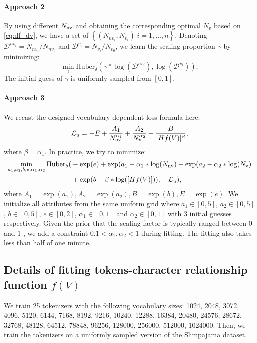 \paragraph{Approach 2}  By using different $N_{\rm nv}$ and obtaining the corresponding optimal $N_v$ based on \autoref{eq:df_dv}, we have a set of  $\left\{  (N_{{nv}_i}, N_{{v}_i})| i=1,...,n \right\}$. Denoting $\mathcal{D}^{{nv}_i} = N_{{nv}_i} / N_{{nv}_0}$ and $\mathcal{D}^{{v}_i} = N_{{v}_i} / N_{{v}_0}$, we learn the scaling proportion $\gamma$ by minimizing:
\begin{equation}
    \min_{\gamma} \text{Huber}_\delta (\gamma*\log(\mathcal{D}^{{nv}_i}), \log(\mathcal{D}^{{v}_i})),
\end{equation}
The initial guess of $\gamma$ is uniformly sampled from $[0,1]$.

\paragraph{Approach 3} We recast the designed  vocabulary-dependent loss formula here:
\begin{equation}
    \mathcal{L}_u = -E + \frac{A_1}{N_{\rm nv}^{\alpha_1}} +\frac{A_2}{N_v^{\alpha_2}}+ \frac{B}{[Hf(V)]^{\beta}},
\end{equation}
where $\beta=\alpha_1$.  In practice, we try to minimize:
\begin{align*}
    \min_{a_1,a_2,b,e,\alpha_1, \alpha_2} \text{Huber}_\delta (&-\exp(e) + \exp(a_1-\alpha_1 * \log(N_{\rm nv}) + \exp(a_2-\alpha_2 * \log(N_{\rm v})\\& + \exp(b-\beta * \log([Hf(V)])), \quad \mathcal{L}_u),    
\end{align*}
where $A_1=\exp(a_1), A_2=\exp(a_2), B=\exp(b), E=\exp(e)$. We initialize all attributes from the same uniform grid where $a_1 \in [0,5]$, $a_2 \in [0,5]$, $b \in [0,5]$, $e \in [0,2]$, $\alpha_1 \in [0,1]$ and  $\alpha_2 \in [0,1]$ with 3 initial guesses respectively. Given the prior that the scaling factor is typically ranged between 0 and 1 \citep{hoffmann2022training}, we add a constraint $0.1 < \alpha_1, \alpha_2 < 1$ during fitting. The fitting also takes less than half of one minute.

\subsection{Details of fitting tokens-character relationship function $f(V)$}
We train 25 tokenizers with the following vocabulary sizes: 1024, 2048, 3072, 4096, 5120, 6144, 7168, 8192, 9216, 10240, 12288, 16384, 20480, 24576, 28672, 32768, 48128, 64512, 78848, 96256, 128000, 256000, 512000, 1024000. Then, we train the tokenizers on a uniformly sampled version of the Slimpajama dataset.

